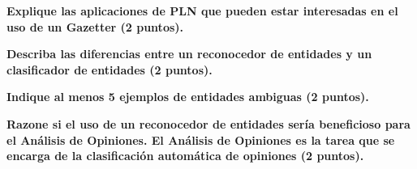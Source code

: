 \documentclass[11pt]{exam}
\begin{document}
\begin{questions}
{\bf \question Explique las aplicaciones de PLN que pueden estar interesadas en el uso de un Gazetter (2 puntos).}

{\bf \question Describa las diferencias entre un reconocedor de entidades y un clasificador de entidades (2 puntos).}

{\bf \question Indique al menos 5 ejemplos de entidades ambiguas (2 puntos).}

{\bf \question Razone si el uso de un reconocedor de entidades sería beneficioso para el Análisis de Opiniones. El Análisis de Opiniones es la tarea que se encarga de la clasificación automática de opiniones (2 puntos).}

\end{questions}
\end{document}
